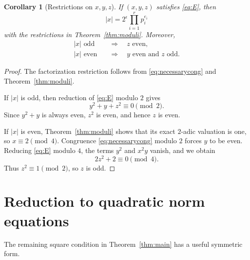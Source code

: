 \documentclass[11pt,a4paper]{amsart}
\numberwithin{equation}{section}
\newtheorem{corollary}[theorem]{Corollary}
\theoremstyle{definition}
\begin{document}
\begin{corollary}[Restrictions on \(x,y,z\)]\label{cor:parity}
If \((x,y,z)\) satisfies \eqref{eq:E}, then
\begin{equation}
 |x|=2^{\epsilon}\prod_{i=1}^r p_i^{e_i}
 \label{eq:xrestriction}
\end{equation}
with the restrictions in Theorem~\ref{thm:moduli}.  Moreover,
\begin{equation}
 \begin{aligned}
 |x|\text{ odd} &\quad\Longrightarrow\quad z\text{ even},\\
 |x|\text{ even}&\quad\Longrightarrow\quad y\text{ even and }z\text{ odd}.
 \end{aligned}
 \label{eq:parityconclusions}
\end{equation}
\end{corollary}

\begin{proof}
The factorization restriction follows from
\eqref{eq:necessarycong} and Theorem~\ref{thm:moduli}.

If \(|x|\) is odd, then reduction of \eqref{eq:E} modulo \(2\) gives
\begin{equation*}
 y^2+y+z^2\equiv0\pmod2.
\end{equation*}
Since \(y^2+y\) is always even, \(z^2\) is even, and hence \(z\) is
even.

If \(|x|\) is even, Theorem~\ref{thm:moduli} shows that its exact
\(2\)-adic valuation is one, so \(x\equiv2\pmod4\).  Congruence
\eqref{eq:necessarycong} modulo \(2\) forces \(y\) to be even.
Reducing \eqref{eq:E} modulo \(4\), the terms \(y^2\) and \(x^2y\)
vanish, and we obtain
\begin{equation*}
 2z^2+2\equiv0\pmod4.
\end{equation*}
Thus \(z^2\equiv1\pmod2\), so \(z\) is odd.
\end{proof}

\section{Reduction to quadratic norm equations}

The remaining square condition in Theorem~\ref{thm:main} has a useful
symmetric form.
\end{document}
